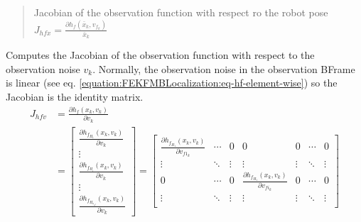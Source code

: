 \documentclass[letterpaper,10pt,english]{sphinxmanual}
\begin{document}
\begin{fulllineitems}
\begin{fulllineitems}
\begin{quote}
\begin{description}
\sphinxAtStartPar
Jacobian of the observation function {\hyperref[\detokenize{FEKFMBLocalization:MapFeature.MapFeature.hf}]{}} with respect ro the robot pose \(J_{hfx}=\frac{\partial h_f(\bar{x}_k,v_{f_k})}{\bar{x}_k}\)

\end{description}\end{quote}

\end{fulllineitems}


\begin{fulllineitems}
\label{\detokenize{FEKFMBLocalization:MapFeature.MapFeature.Jhfv}}
\pysigstartsignatures
{}
\pysigstopsignatures
\sphinxAtStartPar
Computes the Jacobian of the observation function {\hyperref[\detokenize{FEKFMBLocalization:MapFeature.MapFeature.hf}]{}} with respect to the observation noise \(v_k\).
Normally, the observation noise in the observation B\sphinxhyphen{}Frame is linear (see eq. \eqref{equation:FEKFMBLocalization:eq-hf-element-wise}) so the Jacobian is the identity matrix.
\begin{equation}\label{equation:FEKFMBLocalization:eq-Jhfv}
\begin{split}J_{hfv}&=\frac{\partial h_f(x_k,v_k)}{\partial v_k}\\
&=\begin{bmatrix} \frac{\partial h_{f_{H_1}}(x_k,v_k)}{\partial v_k} \\ \vdots \\ \frac{\partial h_{f_{H_i}}(x_k,v_k)}{\partial v_k} \\ \vdots \\ \frac{\partial h_{f_{H_{n_{zf}}}}(x_k,v_k)}{\partial v_k} \end{bmatrix}
=\begin{bmatrix}
    \frac{\partial h_{f_{H_1}}(x_k,v_k)}{\partial v_{f1_k}} &  \cdots & 0 & 0 & 0  & \cdots & 0 \\
    \vdots & \ddots & \vdots & \vdots & \vdots & \ddots & \vdots \\
    0 & \cdots &  0 & \frac{\partial h_{f_{H_1}}(x_k,v_k)}{\partial v_{fi_k}} &  0 & \cdots & 0 \\
    \vdots & \ddots & \vdots & \vdots & \vdots & \ddots & \vdots \\

\end{bmatrix}
\end{split}
\end{equation}
\end{fulllineitems}
\end{fulllineitems}
\end{document}
